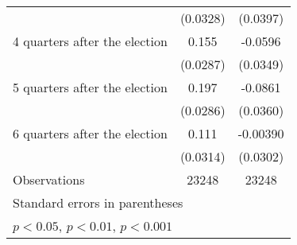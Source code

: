 \begin{table}[htbp]
\begin{tabular}{l*{2}{c}}
                    &    (0.0328)         &    (0.0397)         \\
[1em]
 4 quarters after the election&       0.155\sym{***}&     -0.0596         \\
                    &    (0.0287)         &    (0.0349)         \\
[1em]
 5 quarters after the election&       0.197\sym{***}&     -0.0861\sym{*}  \\
                    &    (0.0286)         &    (0.0360)         \\
[1em]
 6 quarters after the election&       0.111\sym{***}&    -0.00390         \\
                    &    (0.0314)         &    (0.0302)         \\
\hline
Observations        &       23248         &       23248         \\
\hline\hline
\multicolumn{3}{l}{\footnotesize Standard errors in parentheses}\\
\multicolumn{3}{l}{\footnotesize \sym{*} \(p<0.05\), \sym{**} \(p<0.01\), \sym{***} \(p<0.001\)}\\
\end{tabular}
\end{table}
